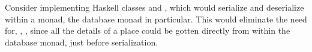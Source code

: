 Consider implementing Haskell classes  and ,
which would serialize and deserialize within a monad, the database
monad in particular. This would eliminate the need
for, \eg, , since all the details of a place could be
gotten directly from  within the database monad, just
before serialization.
